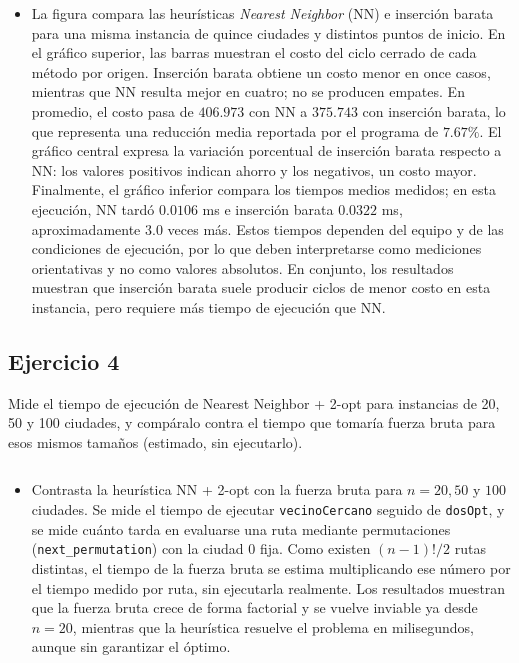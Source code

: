 \documentclass{article}
\begin{document}
\begin{itemize}
\item La figura compara las heurísticas \textit{Nearest Neighbor} (NN) e inserción barata para una misma instancia de quince ciudades y distintos puntos de inicio. En el gráfico superior, las barras muestran el costo del ciclo cerrado de cada método por origen. Inserción barata obtiene un costo menor en once casos, mientras que NN resulta mejor en cuatro; no se producen empates. En promedio, el costo pasa de $406.973$ con NN a $375.743$ con inserción barata, lo que representa una reducción media reportada por el programa de $7.67\%$. El gráfico central expresa la variación porcentual de inserción barata respecto a NN: los valores positivos indican ahorro y los negativos, un costo mayor. Finalmente, el gráfico inferior compara los tiempos medios medidos; en esta ejecución, NN tardó $0.0106$ ms e inserción barata $0.0322$ ms, aproximadamente $3.0$ veces más. Estos tiempos dependen del equipo y de las condiciones de ejecución, por lo que deben interpretarse como mediciones orientativas y no como valores absolutos. En conjunto, los resultados muestran que inserción barata suele producir ciclos de menor costo en esta instancia, pero requiere más tiempo de ejecución que NN.
\end{itemize}

\subsection{Ejercicio 4}
Mide el tiempo de ejecución de Nearest Neighbor + 2-opt para instancias de 20, 50 y 100 ciudades, y compáralo contra el tiempo que tomaría fuerza bruta para esos mismos tamaños (estimado, sin ejecutarlo).
\inputminted{cpp}{../e-n/e4.cpp}

\begin{itemize}
    \item Contrasta la heurística NN + 2-opt con la fuerza bruta para $n = 20, 50$ y
$100$ ciudades. Se mide el tiempo de ejecutar \texttt{vecinoCercano} seguido de
\texttt{dosOpt}, y se mide cuánto tarda en evaluarse una ruta mediante permutaciones
(\texttt{next\_permutation}) con la ciudad 0 fija. Como existen $(n-1)!/2$ rutas distintas,
el tiempo de la fuerza bruta se estima multiplicando ese número por el tiempo medido por
ruta, sin ejecutarla realmente. Los resultados muestran que la fuerza bruta crece de forma
factorial y se vuelve inviable ya desde $n = 20$, mientras que la heurística resuelve el
problema en milisegundos, aunque sin garantizar el óptimo.
\end{itemize}
\end{document}
